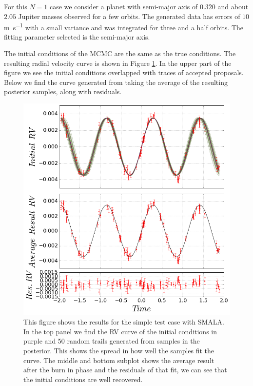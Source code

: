 \documentclass{aa}
\begin{document}
For this $N=1$ case we consider a planet with semi-major axis of $0.320$ and about $2.05$ Jupiter masses observed for a few orbits. The generated data has errors of $10$ \si{\metre\per\second} with a small variance and was integrated for three and a half orbits. The fitting parameter selected is the semi-major axis.

The initial conditions of the MCMC are the same as the true conditions. The resulting radial velocity curve is shown in Figure \ref{FigSimple}. In the upper part of the figure we see the initial conditions overlapped with traces of accepted proposals. Below we find the curve generated from taking the average of the resulting posterior samples, along with residuals.

\begin{figure}
\centering
\includegraphics[width=0.95\hsize]{rv1.png}
   \caption{This figure shows the results for the simple test case with SMALA. In the top panel we find the RV curve of the initial conditions in purple and 50 random trails generated from samples in the posterior. This shows the spread in how well the samples fit the curve. The middle and bottom subplot shows the average result after the burn in phase and the residuals of that fit, we can see that the initial conditions are well recovered.}
      \label{FigSimple}
\end{figure}
\end{document}
